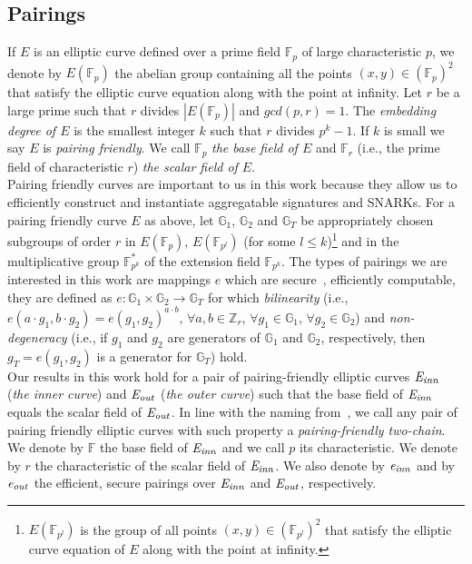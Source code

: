 \subsection{Pairings}
\label{sec:pairings}

\noindent If $E$ is an elliptic curve defined over a prime field $\mathbb{F}_{p}$ of large characteristic $p$, 
we denote by $E(\mathbb{F}_{p})$ the abelian group containing all the points $(x, y) \in (\mathbb{F}_{p})^2$ 
that satisfy the elliptic curve equation along with the point at infinity. Let $r$ be a large prime such that $r$ divides 
$|E(\mathbb{F}_{p})|$ and $\mathit{gcd}(p, r) = 1$. The \emph{embedding degree of $E$} is the smallest integer $k$ 
such that $r$ divides $p^{k}-1$. If $k$ is small we say $E$ is \emph{pairing friendly}. 
We call $\mathbb{F}_p$ \emph{the base field of $E$} and $\mathbb{F}_r$ 
(i.e., the prime field of characteristic $r$) \emph{the scalar field of $E$}. \\

\noindent Pairing friendly curves are important to us in this work because they allow us to efficiently construct 
and instantiate aggregatable signatures and SNARKs. For a pairing friendly curve $E$ as above, 
let $\mathbb{G}_1$, $\mathbb{G}_2$ and $\mathbb{G}_T$ be appropriately chosen subgroups of order
$r$ in $E(\mathbb{F}_{p})$, $E(\mathbb{F}_{p^l})$ (for some $l \leq k$)\footnote{$E(\mathbb{F}_{{p}^l})$ is the group of all points 
$(x,y) \in (\mathbb{F}_{p^l})^2$ that satisfy the elliptic curve equation of $E$ along with the point at infinity.} and in the multiplicative group 
$\mathbb{F}_{p^k}^*$ of the extension field $\mathbb{F}_{p^k}$. The types of pairings we are interested in this work are mappings  
$e$ which are secure~\cite{secure_pairings, pairings_for_cryptographers}, efficiently computable, they are defined as 
$e: \mathbb{G}_1 \times \mathbb{G}_2 \rightarrow \mathbb{G}_T$ for 
which \emph{bilinearity} (i.e., $e(a \cdot g_1, b \cdot g_2) = e(g_1, g_2)^{a\cdot b}$, 
$\forall a, b \in \mathbb{Z}_r$, $\forall g_1 \in \mathbb{G}_1$, $\forall g_2 \in  \mathbb{G}_2$) 
and \emph{non-degeneracy} (i.e., if $g_1$ and $g_2$ are generators of $\mathbb{G}_1$ and 
$\mathbb{G}_2$, respectively, then $g_T = e(g_1, g_2)$ is a generator for $\mathbb{G}_T$) hold. \\ 

\noindent Our results in this work hold for a pair of pairing-friendly elliptic curves $\mathit{E}_{\mathit{inn}}$ (\emph{the inner curve}) and  
$\mathit{E}_{\mathit{out}}$ (\emph{the outer curve}) such that the base field of $\mathit{E}_{\mathit{inn}}$ equals the scalar field of $\mathit{E}_{\mathit{out}}$. In line with the naming 
from~\cite{zexe}, we call any pair of pairing friendly elliptic curves with such property a \emph{pairing-friendly two-chain}. 
We denote by $\mathbb{F}$ the base field of $\mathit{E}_{\mathit{inn}}$ and we call $p$ its characteristic. We denote by $r$ the characteristic of
the scalar field of $\mathit{E}_{\mathit{inn}}$. We also denote by $\mathit{e}_{\mathit{inn}}$ and by $\mathit{e}_{\mathit{out}}$ the efficient, secure pairings over $\mathit{E}_{\mathit{inn}}$ and $\mathit{E}_{\mathit{out}}$, respectively. \\

